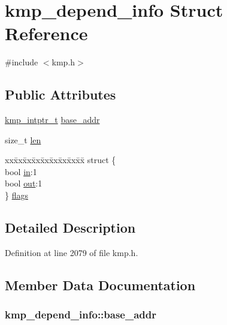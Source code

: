 \hypertarget{structkmp__depend__info}{\section{kmp\-\_\-depend\-\_\-info Struct Reference}
\label{structkmp__depend__info}
}


{\ttfamily \#include $<$kmp.\-h$>$}

\subsection*{Public Attributes}
\begin{DoxyCompactItemize}
\item 
\hyperlink{kmp__os_8h_a43fe09095a192381a5e7c93d20a3a2f9}{kmp\-\_\-intptr\-\_\-t} \hyperlink{structkmp__depend__info_a4b110a3ef2f123f550be5ecfcc51d50a}{base\-\_\-addr}
\item 
size\-\_\-t \hyperlink{structkmp__depend__info_a432a5de100db7d4cb311366e88cc79b2}{len}
\item 
\begin{tabbing}
xx\=xx\=xx\=xx\=xx\=xx\=xx\=xx\=xx\=\kill
struct \{\\
\>bool \hyperlink{structkmp__depend__info_a65b239cf11dd7d59dc86eb9ab5f6e414}{in}:1\\
\>bool \hyperlink{structkmp__depend__info_ad2f4d34c0d6aa127073c9e21a5041244}{out}:1\\
\} \hyperlink{structkmp__depend__info_aa36eee45c425e2a66beb059660c9fb63}{flags}\\

\end{tabbing}\end{DoxyCompactItemize}


\subsection{Detailed Description}


Definition at line 2079 of file kmp.\-h.



\subsection{Member Data Documentation}
\hypertarget{structkmp__depend__info_a4b110a3ef2f123f550be5ecfcc51d50a}{
\subsubsection[{base\-\_\-addr}]{ kmp\-\_\-depend\-\_\-info\-::base\-\_\-addr}}\label{structkmp__depend__info_a4b110a3ef2f123f550be5ecfcc51d50a}


